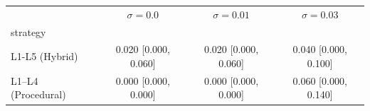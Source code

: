 \begin{tabular}{lccc}
\toprule
 & $\sigma=0.0$ & $\sigma=0.01$ & $\sigma=0.03$ \\
strategy &  &  &  \\
\midrule
L1-L5 (Hybrid) & 0.020 [0.000, 0.060] & 0.020 [0.000, 0.060] & 0.040 [0.000, 0.100] \\
L1–L4 (Procedural) & 0.000 [0.000, 0.000] & 0.000 [0.000, 0.000] & 0.060 [0.000, 0.140] \\
\bottomrule
\end{tabular}
